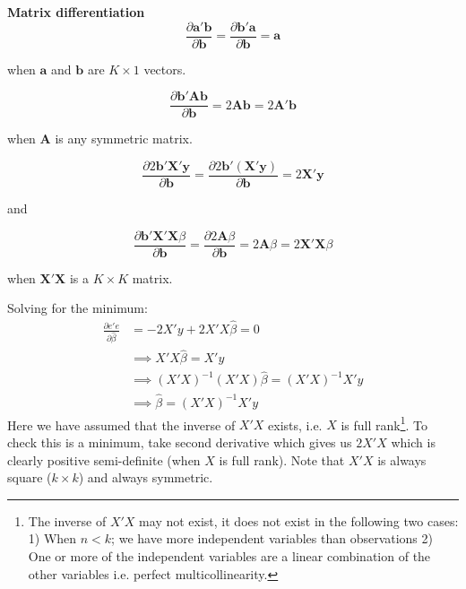 \documentclass[DIV=14,titlepage=false]{scrreprt}
\begin{document}
\begin{note}
    \textbf{Matrix differentiation}
\begin{equation}
\frac{\partial \mathbf{a}' \mathbf{b}}{\partial \mathbf{b}} = \frac{\partial \mathbf{b}' \mathbf{a}}{\partial \mathbf{b}} = \mathbf{a}
\end{equation}

when \(\mathbf{a}\) and \(\mathbf{b}\) are \(K \times 1\) vectors.

\begin{equation}
\frac{\partial \mathbf{b}' \mathbf{Ab}}{\partial \mathbf{b}} = 2\mathbf{Ab} = 2\mathbf{A}' \mathbf{b}
\end{equation}

when \(\mathbf{A}\) is any symmetric matrix.

\begin{equation}
\frac{\partial 2 \mathbf{b}' \mathbf{X}' \mathbf{y}}{\partial \mathbf{b}} = \frac{\partial 2 \mathbf{b}' (\mathbf{X}' \mathbf{y})}{\partial \mathbf{b}} = 2\mathbf{X}' \mathbf{y}
\end{equation}

and

\begin{equation}
\frac{\partial \mathbf{b}' \mathbf{X}' \mathbf{X}\beta}{\partial \mathbf{b}} = \frac{\partial 2 \mathbf{A}\beta}{\partial \mathbf{b}} = 2\mathbf{A}\beta = 2\mathbf{X}' \mathbf{X}\beta
\end{equation}

when \(\mathbf{X}'\mathbf{X}\) is a \(K \times K\) matrix.
\end{note}

Solving for the minimum: 
\begin{align*}
\frac{\partial e'e}{\partial \hat\beta}&=-2X'y+2X'X\hat\beta=0 \\
 &\implies X'X\hat\beta=X'y\\
 &\implies (X'X)^{-1}(X'X)\hat\beta=(X'X)^{-1}X'y\\
 &\implies \hat\beta = (X'X)^{-1}X'y 
\end{align*}
Here we have assumed that the inverse of $X'X$ exists, i.e. $X$ is full rank\footnote[2]{The inverse of $X'X$ may not exist, it does not exist in the following two cases: 1) When $n < k$; we have more independent variables than observations 2) One or more of the independent variables are a linear combination of the other variables i.e. perfect multicollinearity.}. To check this is a minimum, take second derivative which gives us $2X'X$ which is clearly positive semi-definite (when $X$ is full rank). Note that $X'X$ is always square ($k \times k$) and always symmetric.\\
\end{document}
